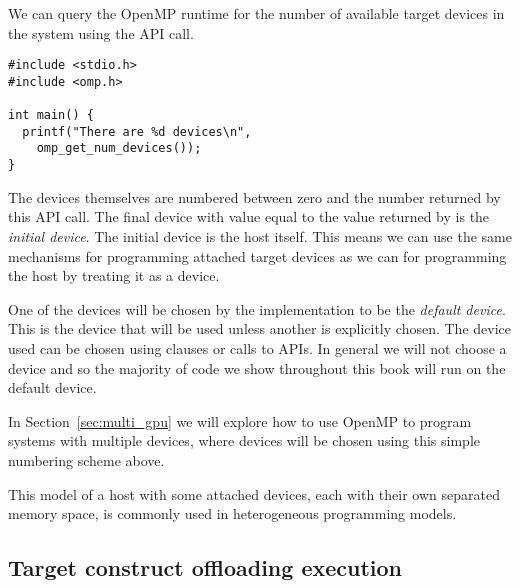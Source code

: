 We can query the OpenMP runtime for the number of available target devices in the system using the  API call.

\begin{verbatim}
#include <stdio.h>
#include <omp.h>

int main() {
  printf("There are %d devices\n",
    omp_get_num_devices());
}
\end{verbatim}

The devices themselves are numbered between zero and the number returned by this API call.
The final device with value equal to the value returned by  is the \emph{initial device}.
The initial device is the host itself.
This means we can use the same mechanisms for programming attached target devices as we can for programming the host by treating it as a device.

One of the devices will be chosen by the implementation to be the \emph{default device}.
This is the device that will be used unless another is explicitly chosen.
The device used can be chosen using clauses or calls to APIs.
In general we will not choose a device and so the majority of code we show throughout this book will run on the default device.

In Section~\ref{sec:multi_gpu} we will explore how to use OpenMP to program systems with multiple devices, where devices will be chosen using this simple numbering scheme above.

This model of a host with some attached devices, each with their own separated memory space, is commonly used in heterogeneous programming models.

\subsection{Target construct offloading execution}


